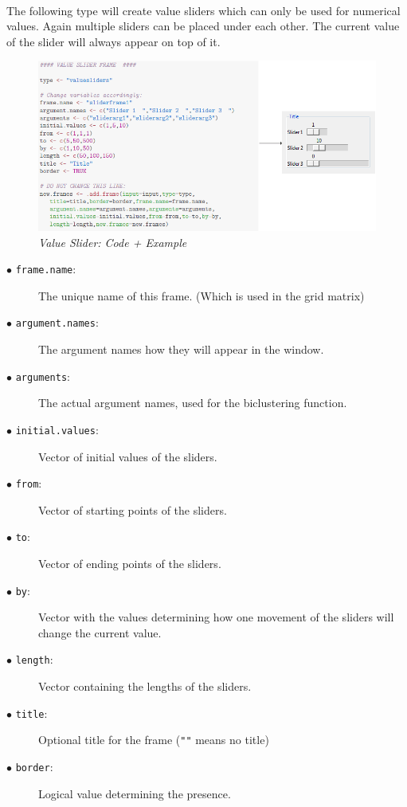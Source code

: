 \documentclass[a4paper]{article}\usepackage[]{graphicx}\usepackage[]{color}
\begin{document}
\\
The following type will create value sliders which can only be used for
numerical values. Again multiple sliders can be placed under each other. The
current value of the slider will always appear on top of it.

\begin{figure}[H]
\centering
\includegraphics[scale=0.5]{figures/slider.png}
\caption{{\it Value Slider: Code + Example}
\label{valuesliders}}
\end{figure}

\begin{description}
  \item[$\bullet$ \texttt{frame.name}:] The unique name of this frame. (Which is used in the grid matrix)
  \item[$\bullet$ \texttt{argument.names}:] The argument names how they will
  appear in the window.  
  \item[$\bullet$ \texttt{arguments}:] The actual argument names, used for the
  biclustering function.  
  \item[$\bullet$ \texttt{initial.values}:] Vector of initial values of the
  sliders.
  \item[$\bullet$ \texttt{from}:] Vector of starting points of the sliders.
  \item[$\bullet$ \texttt{to}:] Vector of ending points of the sliders.
  \item[$\bullet$ \texttt{by}:] Vector with the values determining how one
  movement of the sliders will change the current value.
  \item[$\bullet$ \texttt{length}:] Vector containing the lengths of the
  sliders.
  \item[$\bullet$ \texttt{title}:] Optional title for the frame (\verb|""| means no title)
  \item[$\bullet$ \texttt{border}:] Logical value determining the presence.   
  
\end{description}
\end{document}
